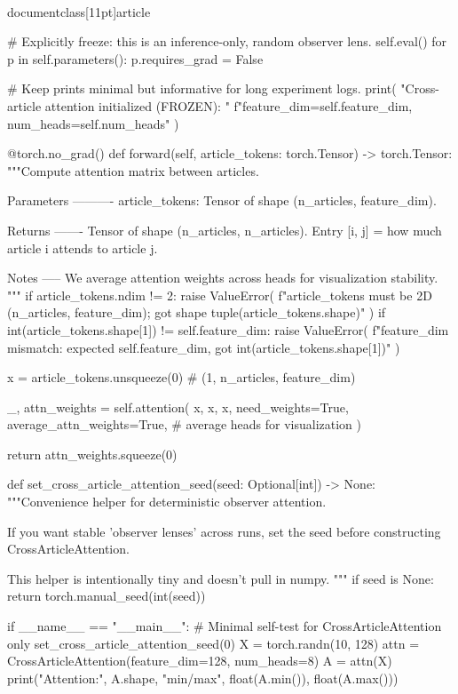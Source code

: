 \\documentclass[11pt]{article}
\begin{document}
\begin{CodeBlock}
        # Explicitly freeze: this is an inference-only, random observer lens.
        self.eval()
        for p in self.parameters():
            p.requires_grad = False

        # Keep prints minimal but informative for long experiment logs.
        print(
            "Cross-article attention initialized (FROZEN): "
            f"feature_dim={self.feature_dim}, num_heads={self.num_heads}"
        )

    @torch.no_grad()
    def forward(self, article_tokens: torch.Tensor) -> torch.Tensor:
        """Compute attention matrix between articles.

        Parameters
        ----------
        article_tokens:
            Tensor of shape (n_articles, feature_dim).

        Returns
        -------
        Tensor of shape (n_articles, n_articles).
        Entry [i, j] = how much article i attends to article j.

        Notes
        -----
        We average attention weights across heads for visualization stability.
        """
        if article_tokens.ndim != 2:
            raise ValueError(
                f"article_tokens must be 2D (n_articles, feature_dim); got shape {tuple(article_tokens.shape)}"
            )
        if int(article_tokens.shape[1]) != self.feature_dim:
            raise ValueError(
                f"feature_dim mismatch: expected {self.feature_dim}, got {int(article_tokens.shape[1])}"
            )

        x = article_tokens.unsqueeze(0)  # (1, n_articles, feature_dim)

        _, attn_weights = self.attention(
            x,
            x,
            x,
            need_weights=True,
            average_attn_weights=True,  # average heads for visualization
        )

        return attn_weights.squeeze(0)


def set_cross_article_attention_seed(seed: Optional[int]) -> None:
    """Convenience helper for deterministic observer attention.

    If you want stable 'observer lenses' across runs, set the seed before
    constructing CrossArticleAttention.

    This helper is intentionally tiny and doesn't pull in numpy.
    """
    if seed is None:
        return
    torch.manual_seed(int(seed))


if __name__ == "__main__":
    # Minimal self-test for CrossArticleAttention only
    set_cross_article_attention_seed(0)
    X = torch.randn(10, 128)
    attn = CrossArticleAttention(feature_dim=128, num_heads=8)
    A = attn(X)
    print("Attention:", A.shape, "min/max", float(A.min()), float(A.max()))

\end{CodeBlock}
\end{document}
